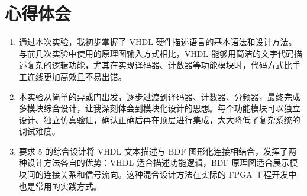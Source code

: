 \documentclass[12pt]{ctexart}
\begin{document}
\section{心得体会}

\begin{enumerate}
    \item 通过本次实验，我初步掌握了 VHDL 硬件描述语言的基本语法和设计方法。与前几次实验中使用的原理图输入方式相比，VHDL 能够用简洁的文字代码描述复杂的逻辑功能，尤其在实现译码器、计数器等功能模块时，代码方式比手工连线更加高效且不易出错。
    \item 本实验从简单的异或门出发，逐步过渡到译码器、计数器、分频器，最终完成多模块综合设计，让我深刻体会到模块化设计的思想。每个功能模块可以独立设计、独立仿真验证，确认正确后再在顶层进行集成，大大降低了复杂系统的调试难度。
    \item 要求 5 的综合设计将 VHDL 文本描述与 BDF 图形化连接相结合，发挥了两种设计方法各自的优势：VHDL 适合描述功能逻辑，BDF 原理图适合展示模块间的连接关系和信号流向。这种混合设计方法在实际的 FPGA 工程开发中也是常用的实践方式。
\end{enumerate}
\end{document}
